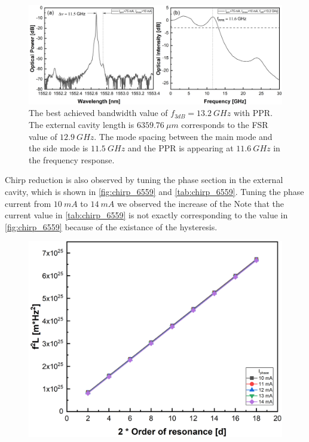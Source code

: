 \begin{figure}[ht]
    \centering
    \includegraphics[width=\linewidth]{figures/spectrum_and_bandwidth_6557.png}
    \caption{The best achieved bandwidth value of $f_{3dB}=13.2 \ GHz$ with PPR. The external cavity length is $6359.76 \ \mu m$ corresponds to the FSR value of $12.9 \ GHz$. The mode spacing between the main mode and the side mode is $11.5 \ GHz$ and the PPR is appearing at $11.6 \ GHz$ in the frequency response.}
    \label{fig:spectra_and_bandwidth_6557}
\end{figure}

Chirp reduction is also observed by tuning the phase section in the external cavity, which is shown in \autoref{fig:chirp_6559} and \autoref{tab:chirp_6559}. Tuning the phase current from $10 \ mA$ to $14 \ mA$ we observed the increase of the Note that the current value in \autoref{tab:chirp_6559} is not exactly corresponding to the value in \autoref{fig:chirp_6559} because of the existance of the hysteresis.

\begin{figure}[ht]
    \centering
    \includegraphics[width=.7\linewidth]{figures/chirp_6559.png}
    \caption{}
    \label{fig:chirp_6559}
\end{figure}

